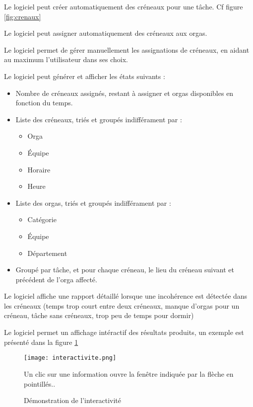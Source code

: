 Le logiciel peut créer automatiquement des créneaux pour une tâche. Cf figure \ref{fig:crenaux}

Le logiciel peut assigner automatiquement des créneaux aux orgas.

Le logiciel permet de gérer manuellement les assignations de créneaux, en aidant au maximum l'utilisateur dans ses choix.

Le logiciel peut générer et afficher les états suivants : 

\begin{itemize}
\item Nombre de créneaux assignés, restant à assigner et orgas disponibles en fonction du temps.
\item Liste des créneaux, triés et groupés indifférament par : 	\begin{itemize}
								  \item Orga
								  \item Équipe
								  \item Horaire
\item Heure
								 \end{itemize}
\item Liste des orgas, triés et groupés indifférament par :  	\begin{itemize}
								  \item Catégorie
								  \item Équipe
								  \item Département
								 \end{itemize}
\item Groupé par tâche, et pour chaque créneau, le lieu du créneau suivant et précédent de l'orga affecté.

\end{itemize}

Le logiciel affiche une rapport détaillé lorsque une incohérence est détectée dans les créneaux (temps trop court entre deux créneaux, manque d'orgas pour un créneau, tâche sans créneaux, trop peu de temps pour dormir)



Le logiciel permet un affichage intéractif des résultats produits, un exemple est présenté dans la figure \ref{fig:interactivite}

\begin{figure}[h!t]
\centering
\texttt{[image: interactivite.png]}

Un clic sur une information ouvre la fenêtre indiquée par la flèche en pointillés..
\caption{Démonstration de l'interactivité}
\label{fig:interactivite}
\end{figure}


